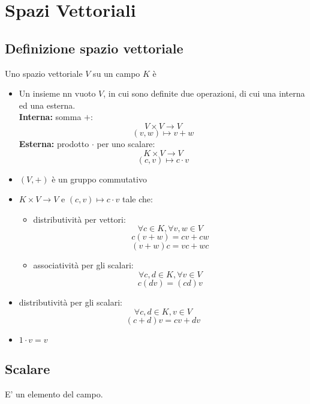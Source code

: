 \section{Spazi Vettoriali}

\subsection{Definizione spazio vettoriale}
Uno spazio vettoriale \(V\) su un campo \(K\) è

\begin{itemize}

	\item Un insieme nn vuoto \(V\), in cui sono definite due operazioni, di cui una interna ed una esterna.
	\\\textbf{Interna:} somma \(+\):
	\[V\times V\rightarrow V\]
	\[(v,w)\mapsto v+w\]
	\textbf{Esterna:} prodotto \(\cdot\) per uno scalare:
	\[K\times V\rightarrow V\]
	\[(c, v)\mapsto c\cdot v\]

	\item \((V,+)\) è un gruppo commutativo

	\item \(K\times V\rightarrow V\) e \((c, v)\mapsto c\cdot v\) tale che:

	\begin{itemize}

		\item distributività per vettori:
		\[\forall c\in K,\forall v,w\in V\]
		\[c(v+w)=cv+cw\]
		\[(v+w)c=vc+wc\]

		\item associatività per gli scalari:
		\[\forall c,d\in K, \forall v\in V\]
		\[c(dv)=(cd)v\]
		
	\end{itemize}

	\item distributività per gli scalari:
	\[\forall c,d\in K, v\in V\]
	\[(c+d)v=cv+dv\]

	\item \(1\cdot v=v\)


\end{itemize}

\subsection{Scalare}
E' un elemento del campo.

